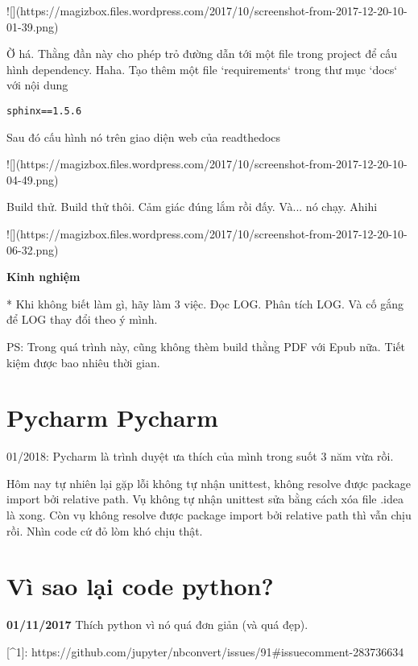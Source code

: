 ![](https://magizbox.files.wordpress.com/2017/10/screenshot-from-2017-12-20-10-01-39.png)

Ờ há. Thằng đần này cho phép trỏ đường dẫn tới một file trong project để cấu hình dependency. Haha.
Tạo thêm một file `requirements` trong thư mục `docs` với nội dung

\begin{lstlisting}
sphinx==1.5.6
\end{lstlisting}


Sau đó cấu hình nó trên giao diện web của readthedocs

![](https://magizbox.files.wordpress.com/2017/10/screenshot-from-2017-12-20-10-04-49.png)

Build thử. Build thử thôi. Cảm giác đúng lắm rồi đấy. Và... nó chạy. Ahihi

![](https://magizbox.files.wordpress.com/2017/10/screenshot-from-2017-12-20-10-06-32.png)

\textbf{Kinh nghiệm}

* Khi không biết làm gì, hãy làm 3 việc. Đọc LOG. Phân tích LOG. Và cố gắng để LOG thay đổi theo ý mình.

PS: Trong quá trình này, cũng không thèm build thằng PDF với Epub nữa. Tiết kiệm được bao nhiêu thời gian.

\section{Pycharm Pycharm}

01/2018: Pycharm là trình duyệt ưa thích của mình trong suốt 3 năm vừa rồi.

Hôm nay tự nhiên lại gặp lỗi không tự nhận unittest, không resolve được package import bởi relative path. Vụ không tự nhận unittest sửa bằng cách xóa file .idea là xong. Còn vụ không resolve được package import bởi relative path thì vẫn chịu rồi. Nhìn code cứ đỏ lòm khó chịu thật.

\section{Vì sao lại code python?}

\textbf{01/11/2017}
Thích python vì nó quá đơn giản (và quá đẹp).

[^1]: https://github.com/jupyter/nbconvert/issues/91#issuecomment-283736634
